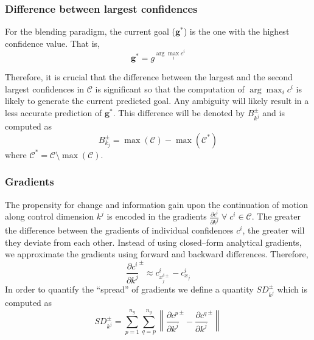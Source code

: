 \documentclass[conference]{IEEEtran}
\newcommand{\argmax}{\arg\!\max}
\newcommand{\norm}[1]{\left\lVert#1\right\rVert}
\begin{document}
\subsubsection{Difference between largest confidences}
For the blending paradigm, the current goal ($\boldsymbol{g}^{*}$) is the one with the highest confidence value. That is, 
\begin{equation*}
\boldsymbol{g}^{*} = g^{\argmax_i c^i}
\end{equation*}

Therefore, it is crucial that the difference between the largest and the second largest confidences in $\mathcal{C}$ is significant so that the computation of $\argmax_i c^i$ is likely to generate the current predicted goal. Any ambiguity will likely result in a less accurate prediction of $\boldsymbol{g}^*$. This difference will be denoted by $B^{\pm}_{k^j}$ and is computed as
\begin{equation*}
B^{\pm}_{k_j} = \max(\mathcal{C}) - \max(\mathcal{C}^*)
\end{equation*}
where $\mathcal{C}^* = \mathcal{C} \setminus {\max(\mathcal{C})}$. 
\subsubsection{Gradients}
The propensity for change and information gain upon the continuation of motion along control dimension $k^j$ is encoded in the gradients $\frac{\partial c^i}{\partial k^j}\; \forall\; c^i\in \mathcal{C}$. The greater the difference between the gradients of individual confidences $c^i$, the greater will they deviate from each other.  Instead of using closed--form analytical gradients, we approximate the gradients using forward and backward differences. Therefore, 
\begin{equation*}
\frac{\partial c^i}{\partial k^j}^{\pm} \approx c^{i}_{x_{j}^{\delta\pm}} - c^{i}_{x_{j}} 
\end{equation*}
In order to quantify the ``spread'' of gradients we define a quantity $SD^{\pm}_{k^j}$ which is computed as 
\begin{equation*}
SD^{\pm}_{k^j} = \sum_{p=1}^{n_g}\sum_{q=p}^{n_g}\norm{\frac{\partial c^p}{\partial k^j}^{\pm} - \frac{\partial c^q}{\partial k^j}^{\pm}}
\end{equation*}
\end{document}
